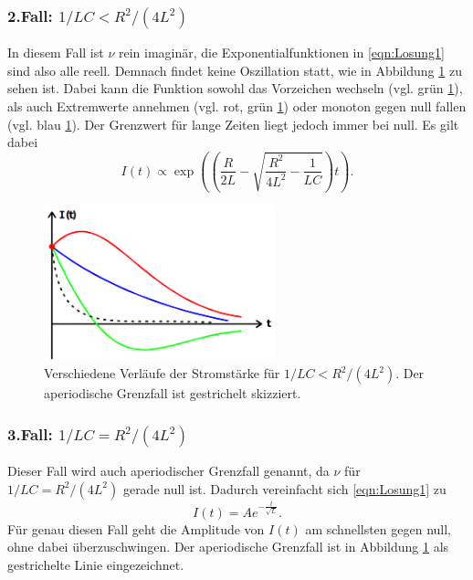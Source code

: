 \subsubsection*{2.Fall: $1/LC<R^2/(4L^2)$}
In diesem Fall ist $\nu$ rein imaginär, die Exponentialfunktionen in \eqref{eqn:Losung1} sind also alle reell. Demnach findet keine Oszillation
statt, wie in Abbildung \ref{fig:Fall2} zu sehen ist. Dabei kann die Funktion sowohl das Vorzeichen wechseln (vgl. grün \ref{fig:Fall2}), als
auch Extremwerte annehmen (vgl. rot, grün \ref{fig:Fall2}) oder monoton gegen null fallen (vgl. blau \ref{fig:Fall2}). Der Grenzwert für lange
Zeiten liegt jedoch immer bei null. Es gilt dabei
\begin{equation*}
    I(t)\propto \exp\left(\left(\frac{R}{2L}-\sqrt{\frac{R^2}{4L^2}-\frac{1}{LC}}\right)t\right)    .
\end{equation*}
\begin{figure}[H]
    \centering
    \includegraphics[width=0.6\textwidth]{pictures/Fall2.png}
    \caption{Verschiedene Verläufe der Stromstärke für $1/LC<R^2/(4L^2)$. Der aperiodische Grenzfall ist gestrichelt skizziert.\cite{AP01}}
    \label{fig:Fall2}
\end{figure}

\subsubsection*{3.Fall: $1/LC=R^2/(4L^2)$}
\label{sec:Fall3}
Dieser Fall wird auch aperiodischer Grenzfall genannt, da $\nu$ für $1/LC=R^2/(4L^2)$ gerade null ist. Dadurch vereinfacht sich \eqref{eqn:Losung1}
zu
\begin{equation*}
    I(t)=Ae^{-\frac{t}{\sqrt{L}}}   .
\end{equation*}
Für genau diesen Fall geht die Amplitude von $I(t)$ am schnellsten gegen null, ohne dabei überzuschwingen. Der aperiodische Grenzfall ist in
Abbildung \ref{fig:Fall2} als gestrichelte Linie eingezeichnet.

